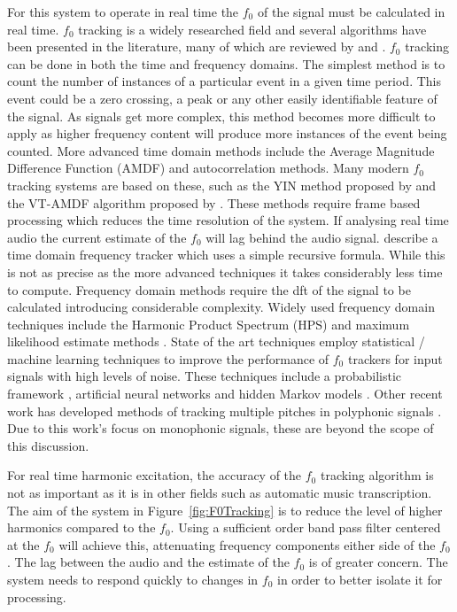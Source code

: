 		For this system to operate in real time the $f_{0}$ of the signal must be calculated in real time.  $f_{0}$
		tracking is a widely researched field and several algorithms have been presented in the literature, many of
		which are reviewed by \citet{cuadra2001efficient} and \citet{gerhard2003pitch}.  $f_{0}$ tracking can be
		done in both the time and frequency domains. The simplest method is to count the number of instances of a
		particular event in a given time period. This event could be a zero crossing, a peak or any other easily
		identifiable feature of the signal. As signals get more complex, this method becomes more difficult to
		apply as higher frequency content will produce more instances of the event being counted. More advanced
		time domain methods include the Average Magnitude Difference Function (AMDF) and autocorrelation methods.
		Many modern $f_{0}$ tracking systems are based on these, such as the YIN method proposed by
		\citet{decheveigne2002yin} and the VT-AMDF algorithm proposed by \citet{prukkanon2009vt-amdf}.  These
		methods require frame based processing which reduces the time resolution of the system. If analysing real
		time audio the current estimate of the $f_{0}$ will lag behind the audio signal. \citet{larsen2004audio}
		describe a time domain frequency tracker which uses a simple recursive formula. While this is not as
		precise as the more advanced techniques it takes considerably less time to compute. Frequency domain
		methods require the \acrshort{dft} of the signal to be calculated introducing considerable complexity.
		Widely used frequency domain techniques include the Harmonic Product Spectrum (HPS) and maximum likelihood
		estimate methods \citep{noll1969pitch}. State of the art techniques employ statistical / machine learning
		techniques to improve the performance of $f_{0}$ trackers for input signals with high levels of noise.
		These techniques include a probabilistic framework \citep{chu2012safe}, artificial neural networks
		\citep{han2014neural} and hidden Markov models \citep{wang2016f0}. Other recent work has developed methods
		of tracking multiple pitches in polyphonic signals \citep{christensen2008multi}.  Due to this work's focus
		on monophonic signals, these are beyond the scope of this discussion.

		For real time harmonic excitation, the accuracy of the $f_{0}$ tracking algorithm is not as important as it
		is in other fields such as automatic music transcription. The aim of the system in
		Figure~\ref{fig:F0Tracking} is to reduce the level of higher harmonics compared to the $f_{0}$. Using a
		sufficient order band pass filter centered at the $f_{0}$ will achieve this, attenuating frequency
		components either side of the $f_{0}$. The lag between the audio and the estimate of the $f_{0}$ is of
		greater concern. The system needs to respond quickly to changes in $f_{0}$ in order to better isolate it
		for processing.

